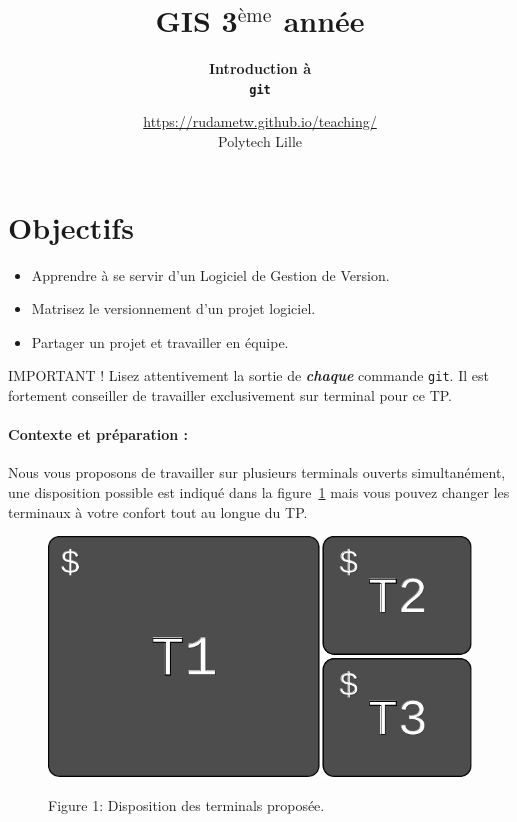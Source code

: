 \documentclass[final, a4paper, openbib, ]{article}
\title{GIS 3$^{\mbox{\`eme}}$ année
}
\author{\huge \textbf{Introduction à} \\  \Huge\textbf{\texttt{git}}}
\date{\Large \url{https://rudametw.github.io/teaching/} \\ Polytech Lille}
\newcommand{\WR}[1]{\textcolor{purple}{#1}}
\newcommand{\WR}[1]{{#1}}
\begin{document}
\vspace{-3cm}
\posttitle{\par\end{center}}
\setlength{\droptitle}{-45pt}
\maketitle

\section{Objectifs}\label{objectifs}

\begin{itemize}
\item Apprendre à se servir d'un Logiciel de Gestion de Version.
\item Matrisez le versionnement d'un projet logiciel.
\item Partager un projet et travailler en équipe.
\end{itemize}

\begin{alertinfo}{IMPORTANT !}
Lisez attentivement la sortie de \textbf{\textit{chaque}} commande \texttt{git}.
Il est fortement conseiller de travailler exclusivement sur terminal pour ce TP.
\end{alertinfo}

\paragraph{Contexte et préparation : } 
Nous vous proposons de travailler sur plusieurs terminals ouverts simultanément, une disposition possible est indiqué dans la figure~\ref{terminals} mais vous pouvez changer les terminaux à votre confort tout au longue du TP.
	\begin{figure}[h]
		\centering
		{\includegraphics[scale=0.6]{images/terminals.pdf}}
		\caption{Figure 1: Disposition des terminals proposée.}
		\label{terminals}
	\end{figure}
\end{document}

